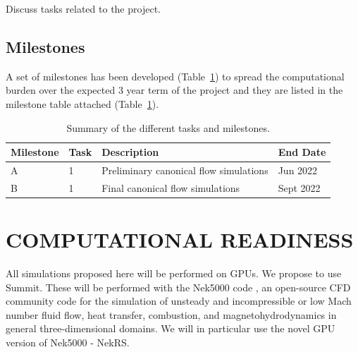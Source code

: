 \documentclass[11pt,letterpaper,english]{article}
\begin{document}
Discuss tasks related to the project.

\vspace{-.25in}
\subsection{Milestones}
\vspace{-.2in}

A set of milestones has been developed (Table~\ref{tab:milestones}) to spread the computational burden over
the expected 3 year term of the project and they are listed in the milestone table attached (Table~\ref{tab:milestones}).

\begin{table}
\centering
\caption{Summary of the different tasks and milestones.}
\begin{tabular}{llll}
\hline
\hline
Milestone & Task & Description & End Date \\
\hline
\hline
A & 1 & Preliminary canonical flow simulations   & Jun  2022 \\
B & 1 & Final canonical flow simulations         & Sept 2022 \\
\hline
\hline
\end{tabular}
\label{tab:milestones}
\end{table}

\vspace{-.25in}
\section{COMPUTATIONAL READINESS}
\vspace{-.2in}

All simulations proposed here will be performed on GPUs. We propose to use
Summit.  These will be performed with the Nek5000 code
\cite{argonne:nekdoc}, an open-source CFD  community code for the simulation of
unsteady and incompressible or low Mach number fluid flow, heat transfer,
combustion, and magnetohydrodynamics in general three-dimensional domains. We
will in particular use the novel GPU version of Nek5000 - NekRS.
\end{document}
